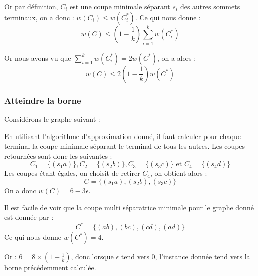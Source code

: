 \documentclass[a4paper, 11pt]{article}
\begin{document}
Or par d\'{e}finition, $C_i$ est une coupe minimale s\'{e}parant $s_i$ des autres sommets terminaux, on a
donc : $w(C_i) \leq w(C_i^*)$. Ce qui nous donne : $$
w(C) \leq (1 - \frac{1}{k}) \sum_{i=1}^k w(C_i^*) 
$$

Or nous avons vu que $\sum_{i=1}^k w(C_i^*) = 2w(C^*)$, on a alors : $$
w(C) \leq 2(1 - \frac{1}{k}) w(C^*) $$

\subsubsection*{Atteindre la borne}

Consid\'{e}rons le graphe suivant :

\begin{figure}[h!]
    \begin{center}
    \end{center}
\end{figure}

En utilisant l'algorithme d'approximation donn\'{e}, il faut calculer pour chaque terminal la coupe
minimale s\'{e}parant le terminal de tous les autres. Les coupes retourn\'{e}es sont donc les suivantes : $$
C_1 = \{(s_1a)\}, C_2 = \{(s_2b)\}, C_3 = \{(s_3c)\} \mbox{ et } C_4 = \{(s_4d)\} $$
Les coupes \'{e}tant \'{e}gales, on choisit de retirer $C_4$, on obtient alors : $$
C = \{(s_1a), (s_2b), (s_3c)\} $$
On a donc $w(C) = 6 - 3 \epsilon$.

Il est facile de voir que la coupe multi s\'{e}paratrice minimale pour le graphe donn\'{e} est donn\'{e}e par :
$$ C^* = \{(ab), (bc), (cd), (ad)\} $$
Ce qui nous donne $w(C^*) = 4$.

Or : $6 = 8 \times (1 - \frac{1}{k})$, donc lorsque $\epsilon$ tend vers $0$, l'instance donn\'{e}e tend
vers la borne pr\'{e}c\'{e}demment calcul\'{e}e.
\end{document}
